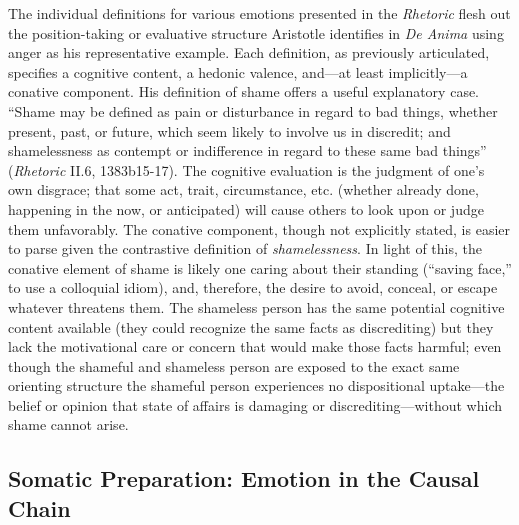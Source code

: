 The individual definitions for various emotions presented in the \textit{Rhetoric} flesh out the position-taking or evaluative structure Aristotle identifies in \textit{De Anima} using anger as his representative example. Each definition, as previously articulated, specifies a cognitive content, a hedonic valence, and---at least implicitly---a conative component. His definition of shame offers a useful explanatory case. ``Shame may be defined as pain or disturbance in regard to bad things, whether present, past, or future, which seem likely to involve us in discredit; and shamelessness as contempt or indifference in regard to these same bad things'' (\textit{Rhetoric} II.6, 1383b15-17). The cognitive evaluation is the judgment of one's own disgrace; that some act, trait, circumstance, etc. (whether already done, happening in the now, or anticipated) will cause others to look upon or judge them unfavorably. The conative component, though not explicitly stated, is easier to parse given the contrastive definition of \textit{shamelessness}. In light of this, the conative element of shame is likely one caring about their standing (``saving face,'' to use a colloquial idiom), and, therefore, the desire to avoid, conceal, or escape whatever threatens them. The shameless person has the same potential cognitive content available (they could recognize the same facts as discrediting) but they lack the motivational care or concern that would make those facts harmful; even though the shameful and shameless person are exposed to the exact same orienting structure the shameful person experiences no dispositional uptake---the belief or opinion that state of affairs is damaging or discrediting---without which shame cannot arise. 

\subsection{Somatic Preparation: Emotion in the Causal Chain}

